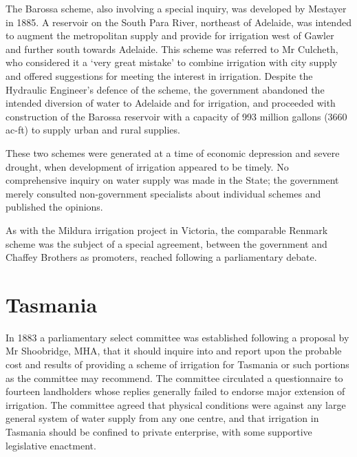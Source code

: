The Barossa scheme, also involving a special inquiry, was developed by
Mestayer in 1885.  A reservoir on the South Para River,
 northeast of
Adelaide, was intended to augment the metropolitan supply and provide
for irrigation west of Gawler  and further south towards
Adelaide.  This scheme was referred to Mr Culcheth,
who considered it a `very great mistake' to combine irrigation with
city supply and offered suggestions for meeting the interest in
irrigation.  Despite the Hydraulic Engineer's defence of the scheme,
the government abandoned the intended diversion of water to Adelaide
and for irrigation, and proceeded with construction of the Barossa
reservoir
 with a capacity of 993 million gallons
(3660\,ac-ft) to supply urban and rural supplies.

These two schemes were generated at a time of economic depression and
severe drought, when development of irrigation appeared to be
timely. No comprehensive inquiry on water supply was made in the
State; the government merely consulted non-government specialists
about individual schemes and published the opinions.

As with the Mildura irrigation project in Victoria, the comparable
Renmark  scheme was the subject of a special agreement,
between the government and Chaffey Brothers  as
promoters, reached following a parliamentary debate.

\section*{Tasmania}

In 1883 a parliamentary select committee was established following a
proposal by Mr Shoobridge, MHA, that it should inquire into and report
upon the probable cost and results of providing a scheme of irrigation
for Tasmania or such portions as the committee may recommend.  The
committee circulated a questionnaire to fourteen landholders whose
replies generally failed to endorse major extension of irrigation.
The committee agreed that physical conditions were against any large
general system of water supply from any one centre, and that
irrigation in Tasmania should be confined to private enterprise, with
some supportive legislative enactment.

